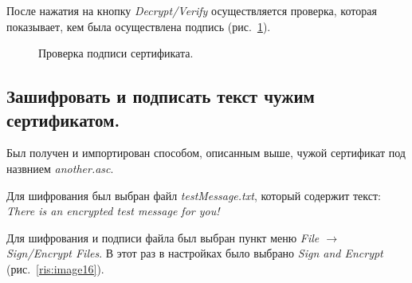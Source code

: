 \documentclass[10pt,a4paper,titlepage]{article}
\begin{document}
После нажатия на кнопку \textit{Decrypt/Verify} осуществляется проверка, которая показывает, кем была осуществлена подпись \mbox{(рис. \ref{ris:image15})}.
\begin{figure}[!h]	
\caption{Проверка подписи сертификата.}
\label{ris:image15}
\end{figure}

\pagebreak
\subsection{Зашифровать и подписать текст чужим сертификатом.}
Был получен и импортирован способом, описанным выше, чужой сертификат под назвнием \textit{another.asc}.

Для шифрования был выбран файл \textit{testMessage.txt}, который содержит текст: \textit{There is an encrypted test message for you!}

Для шифрования и подписи файла был выбран пункт меню \textit{File $\rightarrow$ Sign/Encrypt Files}. В этот раз в настройках было выбрано \textit{Sign and Encrypt} \mbox{(рис. \ref{ris:image16})}.
\end{document}
